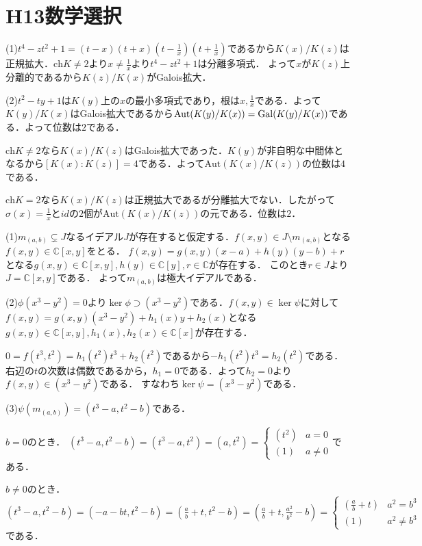 \documentclass[
		book,
		head_space=20mm,
		foot_space=20mm,
		gutter=10mm,
		line_length=190mm
]{jlreq}
\begin{document}
\section{H13数学選択}
(1)$t^4-zt^2+1=(t-x)(t+x)(t-\frac{1}{x})(t+\frac{1}{x})$であるから$K(x)/K(z)$は正規拡大．$ \mathrm{ch} K\neq 2$より$x\neq \frac{1}{x}$より$t^4-zt^2+1$は分離多項式．
よって$x$が$K(z)$上分離的であるから$K(z)/K(x)$がGalois拡大．

(2)$t^2-ty+1$は$K(y)$上の$x$の最小多項式であり，根は$x,\frac{1}{x}$である．よって$K(y)/K(x)$はGalois拡大であるから$\mathrm{Aut}(K(y)/K(x))=\mathop{\mathrm{Gal}}(K(y)/K(x))$である．よって位数は$2$である．

$\mathrm{ch}K\neq 2$なら$K(x)/K(z)$はGalois拡大であった．$K(y)$が非自明な中間体となるから$[K(x):K(z)]=4$である．よって$\mathrm{Aut}(K(x)/K(z))$の位数は$4$である．

$\mathrm{ch}K=2$なら$K(x)/K(z)$は正規拡大であるが分離拡大でない．したがって$\sigma(x)=\frac{1}{x}$と$id$の$2$個が$\mathrm{Aut}(K(x)/K(z))$の元である．位数は$2$．

(1)$m_{(a,b)}\subsetneq J$なるイデアル$J$が存在すると仮定する．$f(x,y)\in J\setminus m_{(a,b)}$となる$f(x,y)\in \mathbb{C}[x,y]$をとる．
$f(x,y)=g(x,y)(x-a)+h(y)(y-b)+r$となる$g(x,y)\in \mathbb{C}[x,y],h(y)\in \mathbb{C}[y],r\in \mathbb{C}$が存在する．
このとき$r \in J$より$J= \mathbb{C}[x,y]$である．
よって$m_{(a,b)}$は極大イデアルである．

(2)$\phi(x^3-y^2)=0$より$\ker \phi \supset (x^3-y^2)$である．$f(x,y)\in \ker \psi$に対して$f(x,y)=g(x,y)(x^3-y^2)+h_1(x)y+h_2(x)$となる$g(x,y)\in \mathbb{C}[x,y],h_1(x),h_2(x)\in \mathbb{C}[x]$が存在する．

$0=f(t^3,t^2)=h_1(t^2)t^3+h_2(t^2)$であるから$-h_1(t^2)t^3=h_2(t^2)$である．右辺の$t$の次数は偶数であるから，$h_1=0$である．よって$h_2=0$より$f(x,y)\in (x^3-y^2)$である．
すなわち$\ker \psi=(x^3-y^2)$である．

(3)$\psi(m_{(a,b)})=(t^3-a,t^2-b)$である．

$b=0$のとき．
$(t^3-a,t^2-b)=(t^3-a,t^2)=(a,t^2)=\begin{cases}
    (t^2) & a=0\\
    (1) & a\neq 0
\end{cases}
$である．

$b\neq 0$のとき．
$(t^3-a,t^2-b)=(-a-bt,t^2-b)=(\frac{a}{b}+t,t^2-b)=(\frac{a}{b}+t,\frac{a^2}{b^2}-b)=\begin{cases}
    (\frac{a}{b}+t) & a^2=b^3\\
    (1) & a^2\neq b^3
\end{cases}
$である．
\end{document}
